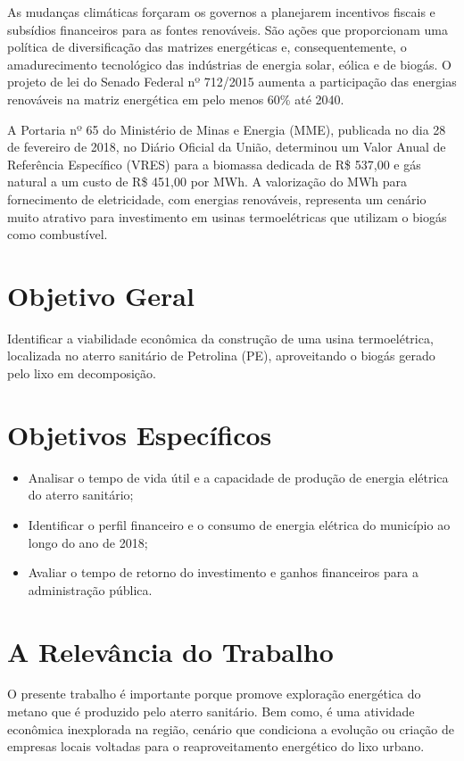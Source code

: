 As mudanças climáticas forçaram os governos a planejarem incentivos fiscais e subsídios financeiros para as fontes renováveis. São ações que proporcionam uma política de diversificação das matrizes energéticas e, consequentemente, o amadurecimento tecnológico das indústrias de energia solar, eólica e de biogás. O projeto de lei do Senado Federal nº 712/2015 aumenta a participação das energias renováveis na matriz energética em pelo menos 60\% até 2040. %

A Portaria nº 65 do Ministério de Minas e Energia (MME), publicada no dia 28 de fevereiro de 2018, no Diário Oficial da União, determinou um Valor Anual de Referência Específico (VRES) para a biomassa dedicada de R\$ 537,00 e gás natural a um custo de R\$ 451,00 por MWh. A valorização do MWh para fornecimento de eletricidade, com energias renováveis, representa um cenário muito atrativo para investimento em usinas termoelétricas que utilizam o biogás como combustível.


\section{Objetivo Geral}
Identificar a viabilidade econômica da construção de uma usina termoelétrica, localizada no aterro sanitário de Petrolina (PE), aproveitando o biogás gerado pelo lixo em decomposição.


\section{Objetivos Específicos}

\begin{itemize}
    \item Analisar o tempo de vida útil e a capacidade de produção de energia elétrica do aterro sanitário;
    \item Identificar o perfil financeiro e o consumo de energia elétrica do município ao longo do ano de 2018;
    \item Avaliar o tempo de retorno do investimento e ganhos financeiros para a administração pública.
\end{itemize}

\section{A Relevância do Trabalho}
O presente trabalho é importante porque promove exploração energética do metano que é produzido pelo aterro sanitário. Bem como, é uma atividade econômica inexplorada na região, cenário que condiciona a evolução ou criação de empresas locais voltadas para o reaproveitamento energético do lixo urbano.

